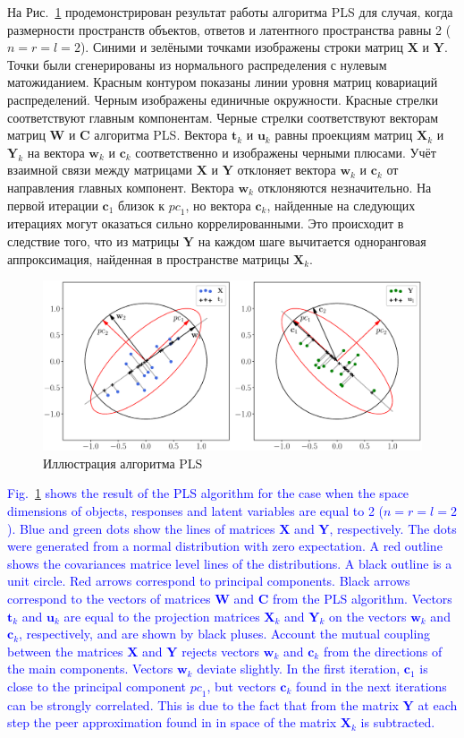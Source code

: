 \documentclass[12pt,twoside]{article}
\newcommand{\bw}{\mathbf{w}}
\newcommand{\bY}{\mathbf{Y}}
\newcommand{\bX}{\mathbf{X}}
\newcommand{\bu}{\mathbf{u}}
\newcommand{\bt}{\mathbf{t}}
\newcommand{\bc}{\mathbf{c}}
\newcommand{\bC}{\mathbf{C}}
\newcommand{\bW}{\mathbf{W}}
\begin{document}
На Рис.~\ref{fig::PLSFigure} продемонстрирован результат работы алгоритма PLS для случая, когда размерности пространств объектов, ответов и латентного пространства равны 2 ($n = r = l = 2$).
Синими и зелёными точками изображены строки матриц $\bX$ и $\bY$. 
Точки были сгенерированы из нормального распределения с нулевым матожиданием. 
Красным контуром показаны линии уровня матриц ковариаций распределений. 
Черным изображены единичные окружности. 
Красные стрелки соответствуют главным компонентам. 
Черные стрелки соответствуют векторам матриц $\bW$ и $\bC$ алгоритма PLS. 
Вектора $\bt_k$ и $\bu_k$ равны проекциям матриц $\bX_k$ и $\bY_k$ на вектора $\bw_k$ и $\bc_k$ соответственно и изображены черными плюсами. 
Учёт взаимной связи между матрицами $\bX$ и $\bY$ отклоняет вектора $\bw_k$ и $\bc_k$ от направления главных компонент. 
Вектора $\bw_k$ отклоняются незначительно. 
На первой итерации $\bc_1$ близок к $\textit{pc}_1$, но вектора $\bc_k$, найденные на следующих итерациях могут оказаться сильно коррелированными. Это происходит в следствие того, что из матрицы $\bY$ на каждом шаге вычитается одноранговая аппроксимация, найденная в пространстве матрицы $\bX_k$.
\begin{figure}[h]
	\centering
	\includegraphics[width=\linewidth]{figs/PLSFigure.eps}
	\caption{Иллюстрация алгоритма PLS}
	\label{fig::PLSFigure}
\end{figure}

\textcolor{blue}{
Fig.~\ref{fig::PLSFigure} shows the result of the PLS algorithm for the case when the space dimensions of objects, responses and latent variables are equal to 2 ($n = r = l = 2$).
Blue and green dots show the lines of matrices $\bX$ and $\bY$, respectively. 
The dots were generated from a normal distribution with zero expectation. 
A red outline shows the covariances matrice level lines of the distributions. 
A black outline is a unit circle. 
Red arrows correspond to principal components. 
Black arrows correspond to the vectors of matrices $\bW$ and $\bC$ from the PLS algorithm. 
Vectors $\bt_k$ and $\bu_k$ are equal to the projection matrices $\bX_k$ and $\bY_k$ on the vectors $\bw_k$ and $\bc_k$, respectively, and are shown by black pluses. 
Account the mutual coupling between the matrices $\bX$ and $\bY$ rejects vectors $\bw_k$ and $\bc_k$ from the directions of the main components. 
Vectors $\bw_k$ deviate slightly. 
In the first iteration, $\bc_1$ is close to the principal component $\textit{pc}_1$, but vectors $\bc_k$ found in the next iterations can be strongly correlated. 
This is due to the fact that from the matrix $\bY$ at each step the peer approximation found in in space of the matrix $\bX_k$ is subtracted.}
\end{document}
